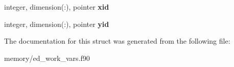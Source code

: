 \begin{DoxyCompactItemize}
\item 
\hypertarget{structed__work__vars_1_1work__vecs_a50213fe4229fc70e4d1b7103dd805092}{
integer, dimension(:), pointer {\bfseries xid}}
\label{structed__work__vars_1_1work__vecs_a50213fe4229fc70e4d1b7103dd805092}

\item 
\hypertarget{structed__work__vars_1_1work__vecs_ad3f01f277a1b74d35f300da84ae40bff}{
integer, dimension(:), pointer {\bfseries yid}}
\label{structed__work__vars_1_1work__vecs_ad3f01f277a1b74d35f300da84ae40bff}

\end{DoxyCompactItemize}


The documentation for this struct was generated from the following file:\begin{DoxyCompactItemize}
\item 
memory/ed\_\-work\_\-vars.f90\end{DoxyCompactItemize}
